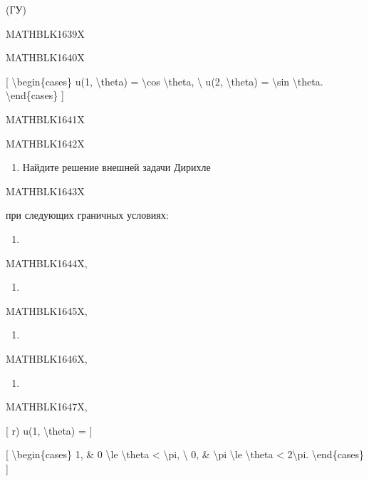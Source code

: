 \documentclass[
]{article}
\providecommand{\tightlist}{%
  \setlength{\itemsep}{0pt}\setlength{\parskip}{0pt}}
\begin{document}
{{{(ГУ)

MATHBLK1639X

MATHBLK1640X

{[} \textbackslash begin\{cases\} u(1, \textbackslash theta) =
\textbackslash cos \textbackslash theta, \textbackslash{} u(2,
\textbackslash theta) = \textbackslash sin \textbackslash theta.
\textbackslash end\{cases\} {]}

MATHBLK1641X

MATHBLK1642X

\begin{enumerate}
\def\labelenumi{\arabic{enumi}.}
\setcounter{enumi}{1}
\tightlist
\item
  Найдите решение внешней задачи Дирихле
\end{enumerate}

MATHBLK1643X

при следующих граничных условиях:

\begin{enumerate}
\def\labelenumi{\alph{enumi})}
\tightlist
\item
\end{enumerate}

MATHBLK1644X,

\begin{enumerate}
\def\labelenumi{\arabic{enumi})}
\setcounter{enumi}{5}
\tightlist
\item
\end{enumerate}

MATHBLK1645X,

\begin{enumerate}
\def\labelenumi{\Alph{enumi})}
\setcounter{enumi}{1}
\tightlist
\item
\end{enumerate}

MATHBLK1646X,

\begin{enumerate}
\def\labelenumi{\Alph{enumi})}
\setcounter{enumi}{1}
\tightlist
\item
\end{enumerate}

MATHBLK1647X,

{[} r) u(1, \textbackslash theta) = {]}

{[} \textbackslash begin\{cases\} 1, \& 0 \textbackslash le
\textbackslash theta \textless{} \textbackslash pi, \textbackslash{} 0,
\& \textbackslash pi \textbackslash le \textbackslash theta \textless{}
2\textbackslash pi. \textbackslash end\{cases\} {]}

}}}
\end{document}
